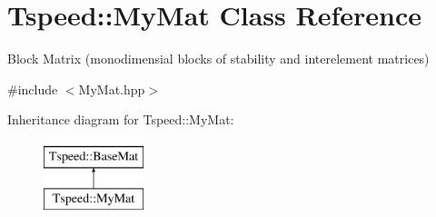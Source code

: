 \hypertarget{classTspeed_1_1MyMat}{\section{Tspeed\-:\-:My\-Mat Class Reference}
\label{classTspeed_1_1MyMat}
}


Block Matrix (monodimensial blocks of stability and interelement matrices)  




{\ttfamily \#include $<$My\-Mat.\-hpp$>$}

Inheritance diagram for Tspeed\-:\-:My\-Mat\-:\begin{figure}[H]
\begin{center}
\leavevmode
\includegraphics[height=2.000000cm]{classTspeed_1_1MyMat}
\end{center}
\end{figure}
